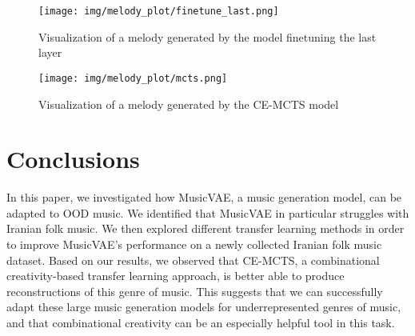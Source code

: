 \documentclass[letterpaper]{article}
\begin{document}
\begin{figure}[tbh]
    \centering
    \texttt{[image: img/melody\_plot/finetune\_last.png]}
    \caption{Visualization of a melody generated by the model finetuning the last layer}
    \label{fig:finetunelast}
\end{figure}

\begin{figure}[tbh]
    \centering
    \texttt{[image: img/melody\_plot/mcts.png]}
    \caption{Visualization of a melody generated by the CE-MCTS model}
    \label{fig:cemcts}
\end{figure}

\section{Conclusions}
In this paper, we investigated how MusicVAE, a music generation model, can be adapted to OOD music.
We identified that MusicVAE in particular struggles with Iranian folk music. We then explored different transfer learning methods in order to improve MusicVAE's performance on a newly collected Iranian folk music dataset. Based on our results, we observed that CE-MCTS, a combinational creativity-based transfer learning approach, is better able to produce reconstructions of this genre of music. This suggests that we can successfully adapt these large music generation models for underrepresented genres of music, and that combinational creativity can be an especially helpful tool in this task. 










\end{document}
